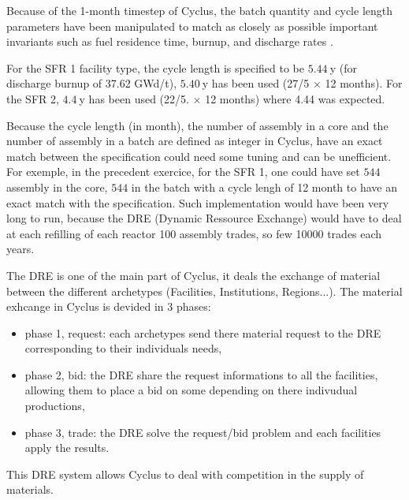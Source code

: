 \documentclass[12pt]{article}
\begin{document}



Because of the 1-month timestep of Cyclus, the batch quantity and cycle length
parameters have been manipulated to match as closely as possible important
invariants such as fuel residence time, burnup, and discharge rates
\cite{B.Feng_calculation}.

For the SFR 1 facility type, the cycle length is specified to be $5.44~$y (for
discharge burnup of 37.62 GWd/t), $5.40~$y has been used (27/5 $\times$ 12
months). For the SFR 2, $4.4~$y has been used (22/5. $\times$ 12 months) where
4.44 was expected. 

Because the cycle length (in month), the number of assembly in a core and the number of
assembly in a batch are defined as integer in Cyclus, have an exact match between
the specification could need some tuning and can be unefficient. For exemple, in
the precedent exercice, for the SFR 1, one could have set $544~$assembly in the
core, $544$ in the batch with a cycle lengh of 12 month to have an exact match
with the specification. Such implementation would have been very long to run,
because the DRE (Dynamic Ressource Exchange) would have to deal at each refilling of each reactor 100 assembly
trades, so few 10000 trades each years.

The DRE is one of the main part of Cyclus, it deals the exchange of material between
the different archetypes (Facilities, Institutions, Regions...). The material
exhcange in Cyclus is devided in 3 phases: 
\begin{itemize}
  \item phase 1, request: each archetypes send there material request to the DRE
    corresponding to their individuals needs,
  \item phase 2, bid: the DRE share the request informations to all the
    facilities, allowing them to place a bid on some depending on there indivudual productions,
  \item phase 3, trade: the DRE solve the request/bid problem and each facilities
    apply the results.
\end{itemize}

This DRE system allows Cyclus to deal with competition in the supply of materials. 
\end{document}
